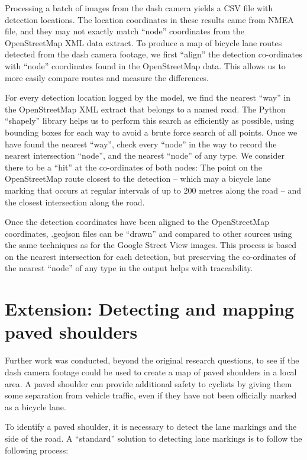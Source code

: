 \documentclass[11pt,twoside]{report}
\begin{document}
Processing a batch of images from the dash camera yields a CSV file with detection locations.  The location coordinates in these results came from NMEA file, and they may not exactly match ``node'' coordinates from the OpenStreetMap XML data extract.  To produce a map of bicycle lane routes detected from the dash camera footage, we first ``align'' the detection co-ordinates with ``node'' coordinates found in the OpenStreetMap data.  This allows us to more easily compare routes and measure the differences.

For every detection location logged by the model, we find the nearest ``way'' in the OpenStreetMap XML extract that belongs to a named road.  The Python ``shapely'' library helps us to perform this search as efficiently as possible, using bounding boxes for each way to avoid a brute force search of all points.  Once we have found the nearest ``way'', check every ``node'' in the way to record the nearest intersection ``node'', and the nearest ``node'' of any type.  We consider there to be a ``hit'' at the co-ordinates of both nodes:  The point on the OpenStreetMap route closest to the detection -- which may a bicycle lane marking that occurs at regular intervals of up to 200 metres along the road \cite{standards} -- and the closest intersection along the road.

Once the detection coordinates have been aligned to the OpenStreetMap coordinates, .geojson files can be ``drawn'' and compared to other sources using the same techniques as for the Google Street View images.  This process is based on the nearest intersection for each detection, but preserving the co-ordinates of the nearest ``node'' of any type in the output helps with traceability.


\section{Extension: Detecting and mapping paved shoulders}

Further work was conducted, beyond the original research questions, to see if the dash camera footage could be used to create a map of paved shoulders in a local area.  A paved shoulder can provide additional safety to cyclists by giving them some separation from vehicle traffic, even if they have not been officially marked as a bicycle lane.

To identify a paved shoulder, it is necessary to detect the lane markings and the side of the road.  A ``standard'' solution to detecting lane markings is to follow the following process:
\end{document}
